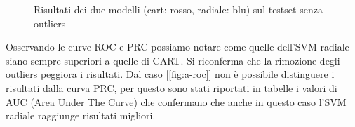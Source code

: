 \begin{figure}[H]
    \centering

    \quad
    
    \label{fig:measures_svm}
    \caption{Risultati dei due modelli (cart: rosso, radiale: blu) sul testset senza outliers}
\end{figure}


\noindent
Osservando le curve ROC e PRC possiamo notare come quelle dell'SVM radiale siano sempre superiori a quelle di CART.
Si riconferma che la rimozione degli outliers peggiora i risultati.
Dal caso [\ref{fig:a-roc}] non è possibile distinguere i risultati dalla curva PRC, per questo sono stati riportati in tabelle i valori di AUC (Area Under The Curve) che confermano che anche in questo caso l'SVM radiale raggiunge risultati migliori.

